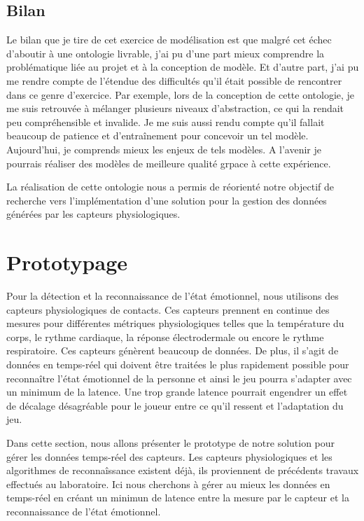 \documentclass{article}
\begin{document}
	\subsection{Bilan}\label{sec:modelbilan}
		Le bilan que je tire de cet exercice de modélisation est que malgré cet échec d'aboutir à une ontologie livrable, j'ai pu d'une part mieux comprendre la problématique liée au projet et à la conception de modèle.
		Et d'autre part, j'ai pu me rendre compte de l'étendue des difficultés qu'il était possible de rencontrer dans ce genre d'exercice.
		Par exemple, lors de la conception de cette ontologie, je me suis retrouvée à mélanger plusieurs niveaux d'abstraction, ce qui la rendait peu compréhensible et invalide. 
		Je me suis aussi rendu compte qu'il fallait beaucoup de patience et d'entraînement pour concevoir un tel modèle. 
		Aujourd'hui, je comprends mieux les enjeux de tels modèles. 
		A l'avenir je pourrais réaliser des modèles de meilleure qualité grpace à cette expérience.\par
		La réalisation de cette ontologie nous a permis de réorienté notre objectif de recherche vers l'implémentation d'une solution pour la gestion des données générées par les capteurs physiologiques.

\section{Prototypage}\label{sec:prototypage}
	Pour la détection et la reconnaissance de l'état émotionnel, nous utilisons des capteurs physiologiques de contacts.
	Ces capteurs prennent en continue des mesures pour différentes métriques physiologiques telles que la température du corps, le rythme cardiaque, la réponse électrodermale ou encore le rythme respiratoire.
	Ces capteurs génèrent beaucoup de données.
	De plus, il s'agit de données en temps-réel qui doivent être traitées le plus rapidement possible pour reconnaître l'état émotionnel de la personne et ainsi le jeu pourra s'adapter avec un minimum de la latence.
	Une trop grande latence pourrait engendrer un effet de décalage désagréable pour le joueur entre ce qu'il ressent et l'adaptation du jeu.\par
	Dans cette section, nous allons présenter le prototype de notre solution pour gérer les données temps-réel des capteurs.
	Les capteurs physiologiques et les algorithmes de reconnaîssance existent déjà, ils proviennent de précédents travaux effectués au laboratoire.
	Ici nous cherchons à gérer au mieux les données en temps-réel en créant un minimun de latence entre la mesure par le capteur et la reconnaissance de l'état émotionnel.
\end{document}
